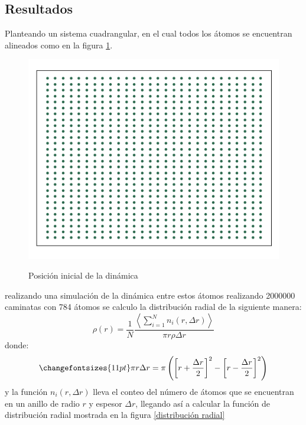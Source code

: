 \documentclass[12pt,letterpaper]{article}
\begin{document}
\begin{multicols}{2}
\section*{Resultados}
Planteando un sistema cuadrangular, en el cual todos los átomos se encuentran alineados como en la figura \ref{pos inicial}.
\begin{figure}[H]
    \hspace*{-0.5cm}
    \includegraphics[scale=0.4]{../Graphics/Cor_in.png}\\
    \caption{Posición inicial de la dinámica}
    \label{pos inicial}
\end{figure}
realizando una simulación de la dinámica entre estos átomos realizando 2000000 caminatas con 784 átomos se calculo la distribución radial de la siguiente manera:
\begin{equation}
    \rho(r) = \frac{1}{N} \frac{\left\langle \sum_{i=1}^N n_i(r,\Delta r)  \right\rangle}{\pi r \rho \Delta r}
    \label{eq:rhor}
\end{equation}
donde:
\begin{equation}
    \changefontsizes{11pt}
    \label{eq:area}
    \pi r \Delta r = \pi \left(\left[r +\frac{\Delta r}{2}\right]^2 - \left[r- \frac{\Delta r}{2} \right]^2 \right)
\end{equation}
y la función $n_i(r,\Delta r)$ lleva el conteo del número de átomos que se encuentran en un anillo de radio $r$ y espesor $\Delta r$, llegando así a calcular la función de distribución radial mostrada en la figura \ref{distribución radial}
\begin{figure}[H]

\end{figure}
\end{multicols}
\end{document}
